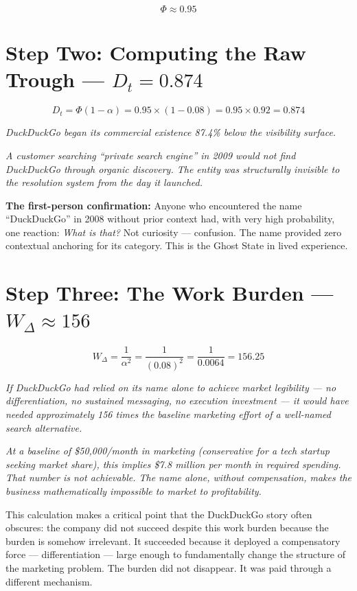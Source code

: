 \documentclass[12pt, openany]{book}
\theoremstyle{thmstyle}
\theoremstyle{defstyle}
\begin{document}
\[
\Phi \approx 0.95
\]

\section{Step Two: Computing the Raw Trough --- $D_t = 0.874$}

\begin{calcbox}
\[
D_t = \Phi(1 - \alpha) = 0.95 \times (1 - 0.08) = 0.95 \times 0.92 = \mathbf{0.874}
\]

\textit{DuckDuckGo began its commercial existence 87.4\% below the visibility surface.}

\textit{A customer searching ``private search engine'' in 2009 would not find DuckDuckGo through organic discovery. The entity was structurally invisible to the resolution system from the day it launched.}
\end{calcbox}

\textbf{The first-person confirmation:} Anyone who encountered the name ``DuckDuckGo'' in 2008 without prior context had, with very high probability, one reaction: \textit{What is that?} Not curiosity --- confusion. The name provided zero contextual anchoring for its category. This is the Ghost State in lived experience.

\section{Step Three: The Work Burden --- $W_\Delta \approx 156$}

\begin{calcbox}
\[
W_\Delta = \frac{1}{\alpha^2} = \frac{1}{(0.08)^2} = \frac{1}{0.0064} = \mathbf{156.25}
\]

\textit{If DuckDuckGo had relied on its name alone to achieve market legibility --- no differentiation, no sustained messaging, no execution investment --- it would have needed approximately 156 times the baseline marketing effort of a well-named search alternative.}

\textit{At a baseline of \$50,000/month in marketing (conservative for a tech startup seeking market share), this implies \$7.8 million per month in required spending. That number is not achievable. The name alone, without compensation, makes the business mathematically impossible to market to profitability.}
\end{calcbox}

This calculation makes a critical point that the DuckDuckGo story often obscures: the company did not succeed despite this work burden because the burden is somehow irrelevant. It succeeded because it deployed a compensatory force --- differentiation --- large enough to fundamentally change the structure of the marketing problem. The burden did not disappear. It was paid through a different mechanism.
\end{document}
